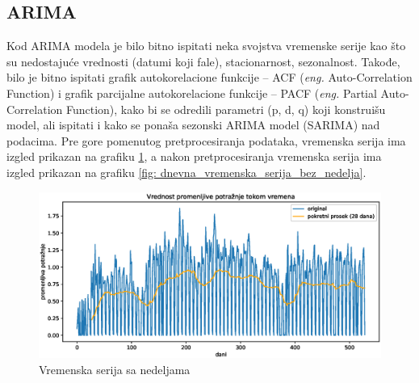 \documentclass[12pt,oneside]{memoir}
\begin{document}
\subsection{ARIMA}
Kod ARIMA modela je bilo bitno ispitati neka svojstva vremenske serije kao što su nedostajuće vrednosti (datumi koji fale), stacionarnost, sezonalnost. Takođe, bilo je bitno ispitati grafik autokorelacione funkcije -- ACF (\textit{eng.} Auto-Correlation Function) i grafik parcijalne autokorelacione funkcije -- PACF (\textit{eng.} Partial Auto-Correlation Function), kako bi se odredili parametri (p, d, q) koji konstruišu model, ali ispitati i kako se ponaša sezonski ARIMA model (SARIMA) nad podacima. Pre gore pomenutog pretprocesiranja podataka, vremenska serija ima izgled prikazan na grafiku \ref{fig: dnevna_sa_nedeljama}, a nakon pretprocesiranja vremenska serija ima izgled prikazan na grafiku \ref{fig: dnevna_vremenska_serija_bez_nedelja}. 

\begin{figure}[!ht]
  \centering
  \includegraphics[width=1\textwidth]{./grafici/vremenska_serija_primer.eps}
  \caption{Vremenska serija sa nedeljama}
  \label{fig: dnevna_sa_nedeljama}
\end{figure}
\end{document}
